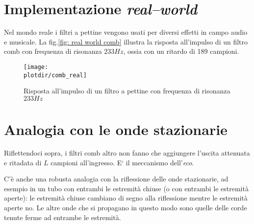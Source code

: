 \section{Implementazione \emph{real--world}}

Nel mondo reale i filtri a pettine vengono usati per diversi effetti in campo
audio e musicale. La fig.\vref{fig: real world comb} illustra la risposta
all'impulso di un filtro comb con frequenza di risonanza $233 Hz$, ossia con
un ritardo di 189 campioni.
\begin{figure}[htbp]
	\begin{center}
	  \texttt{[image: \\plotdir/comb\_real]}
	  \caption{Risposta all'impulso di un filtro a pettine con frequenza di
		risonanza $233 Hz$\label{fig: real world comb}}
	\end{center}
\end{figure}

\section{Analogia con le onde stazionarie}

Riflettendoci sopra, i filtri comb altro non fanno che aggiungere l'uscita
attenuata e ritadata di $L$ campioni all'ingresso. E` il meccanismo
dell'\emph{eco}.

C'\`e anche una robusta analogia con la riflessione delle onde stazionarie,
ad esempio in un tubo con entrambi le estremit\`a chiuse (o con entrambi le
estremit\`a aperte): le estremit\`a chiuse cambiano di segno alla riflessione
mentre le estremit\`a aperte no. Le altre onde che si propagano in questo modo
sono quelle delle corde tenute ferme ad entrambe le estremit\`a.
